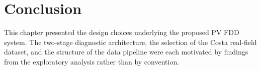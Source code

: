 




\section{Conclusion}

This chapter presented the design choices underlying the proposed PV FDD system. The two-stage diagnostic architecture, the selection of the Costa real-field dataset, and the structure of the data pipeline were each motivated by findings from the exploratory analysis rather than by convention.

